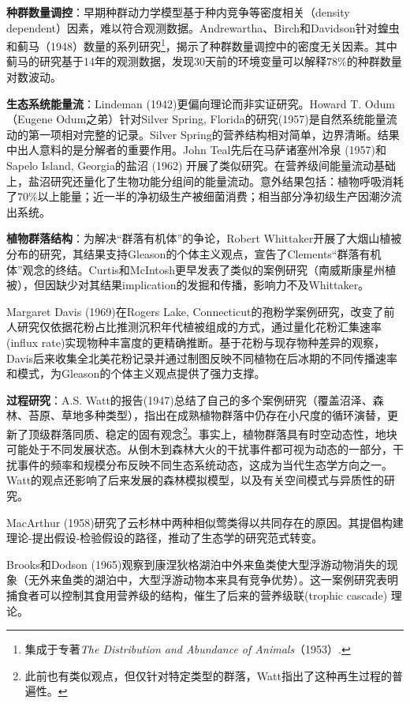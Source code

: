 \textbf{种群数量调控}：早期种群动力学模型基于种内竞争等密度相关（density dependent）因素，难以符合观测数据。Andrewartha、Birch和Davidson针对蝗虫和蓟马（1948）数量的系列研究\footnote{集成于专著\emph{The Distribution and Abundance of Animals}（1953）.}，揭示了种群数量调控中的密度无关因素。其中蓟马的研究基于14年的观测数据，发现30天前的环境变量可以解释78\%的种群数量对数波动。

\textbf{生态系统能量流}：Lindeman (1942)更偏向理论而非实证研究。Howard T. Odum（Eugene Odum之弟）针对Silver Spring, Florida的研究(1957)是自然系统能量流动的第一项相对完整的记录。Silver Spring的营养结构相对简单，边界清晰。结果中出人意料的是分解者的重要作用。John Teal先后在马萨诸塞州冷泉 (1957)和Sapelo Island, Georgia的盐沼 (1962) 开展了类似研究。在营养级间能量流动基础上，盐沼研究还量化了生物功能分组间的能量流动。意外结果包括：植物呼吸消耗了70\%以上能量；近一半的净初级生产被细菌消费；相当部分净初级生产因潮汐流出系统。

\textbf{植物群落结构}：为解决“群落有机体”的争论，Robert Whittaker开展了大烟山植被分布的研究，其结果支持Gleason的个体主义观点，宣告了Clements“群落有机体”观念的终结。Curtis和McIntosh更早发表了类似的案例研究（南威斯康星州植被），但因缺少对其结果implication的发掘和传播，影响力不及Whittaker。

Margaret Davis (1969)在Rogers Lake, Connecticut的孢粉学案例研究，改变了前人研究仅依据花粉占比推测沉积年代植被组成的方式，通过量化花粉汇集速率(influx rate)实现物种丰富度的更精确推断。基于花粉与现存物种差异的观察，Davis后来收集全北美花粉记录并通过制图反映不同植物在后冰期的不同传播速率和模式，为Gleason的个体主义观点提供了强力支撑。

\textbf{过程研究}：A.S. Watt的报告(1947)总结了自己的多个案例研究（覆盖沼泽、森林、苔原、草地多种类型），指出在成熟植物群落中仍存在小尺度的循环演替，更新了顶级群落同质、稳定的固有观念\footnote{此前也有类似观点，但仅针对特定类型的群落，Watt指出了这种再生过程的普遍性。}。事实上，植物群落具有时空动态性，地块可能处于不同发展状态。从倒木到森林大火的干扰事件都可视为动态的一部分，干扰事件的频率和规模分布反映不同生态系统动态，这成为当代生态学方向之一。Watt的观点还影响了后来发展的森林模拟模型，以及有关空间模式与异质性的研究。

MacArthur (1958)研究了云杉林中两种相似莺类得以共同存在的原因。其提倡构建理论-提出假设-检验假设的路径，推动了生态学的研究范式转变。

Brooks和Dodson (1965)观察到康涅狄格湖泊中外来鱼类使大型浮游动物消失的现象（无外来鱼类的湖泊中，大型浮游动物本来具有竞争优势）。这一案例研究表明捕食者可以控制其食用营养级的结构，催生了后来的营养级联(trophic cascade) 理论。

